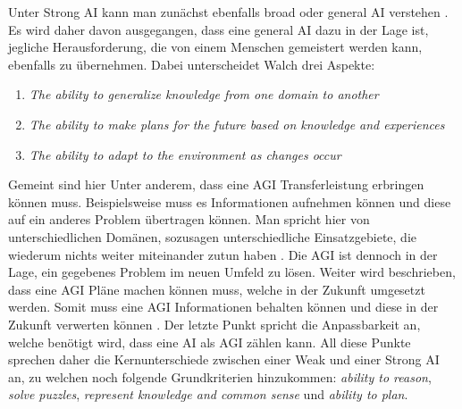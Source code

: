             Unter Strong AI kann man zunächst ebenfalls broad oder general AI verstehen \cite{walch_world_2019}. Es wird
            daher davon ausgegangen, dass eine general AI dazu in der Lage ist, jegliche Herausforderung, die von einem
            Menschen gemeistert werden kann, ebenfalls zu übernehmen. Dabei unterscheidet Walch drei Aspekte:
            \begin{enumerate}
                \item \textit{The ability to generalize knowledge from one domain to another}
                \item \textit{The ability to make plans for the future based on knowledge and experiences}
                \item \textit{The ability to adapt to the environment as changes occur}
            \end{enumerate}
            \cite{walch_world_2019}
            Gemeint sind hier Unter anderem, dass eine AGI Transferleistung erbringen können muss. Beispielsweise muss
            es Informationen aufnehmen können und diese auf ein anderes Problem übertragen können. Man spricht hier von
            unterschiedlichen Domänen, sozusagen unterschiedliche Einsatzgebiete, die wiederum nichts weiter miteinander
            zutun haben \cite{walch_world_2019}. Die AGI ist dennoch in der Lage, ein gegebenes Problem im neuen Umfeld
            zu lösen. Weiter wird beschrieben, dass eine AGI Pläne machen können muss, welche in der Zukunft umgesetzt
            werden. Somit muss eine AGI Informationen behalten können und diese in der Zukunft verwerten können
            \cite{walch_world_2019}. Der letzte Punkt spricht die Anpassbarkeit an, welche benötigt wird, dass eine AI
            als AGI zählen kann. All diese Punkte sprechen daher die Kernunterschiede zwischen einer Weak und einer
            Strong AI an, zu welchen noch folgende Grundkriterien hinzukommen: \textit{ability to reason},
            \textit{solve puzzles}, \textit{represent knowledge and common sense} und \textit{ability to plan}.

